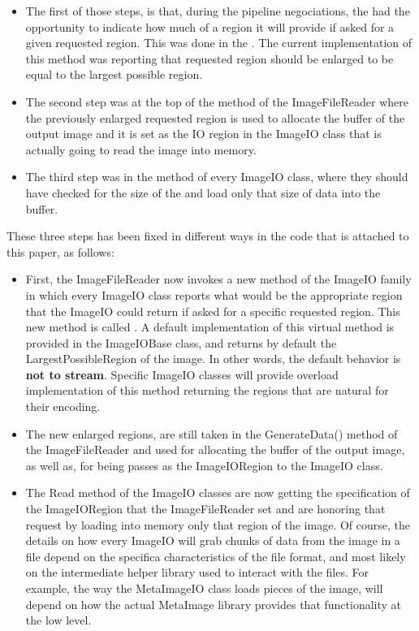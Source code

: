 \documentclass{InsightArticle}
\begin{document}
\begin{itemize}
\item The first of those steps, is that, during the pipeline negociations, the
 had the opportunity to indicate how much of a region
it will provide if asked for a given requested region. This was done in the
. The current implementation of this method
was reporting that requested region should be enlarged to be equal to the largest
possible region.

\item The second step was at the top of the  method of the ImageFileReader
where the previously enlarged requested region is used to allocate the buffer of the output
image and it is set as the IO region in the ImageIO class that is actually going to read
the image into memory.

\item The third step was in the  method of every ImageIO class, where they should have
checked for the size of the  and load only that size of data into the
buffer.
\end{itemize}

These three steps has been fixed in different ways in the code that is attached
to this paper, as follows:


\begin{itemize}
\item First, the ImageFileReader now invokes a new method of the ImageIO family
in which every ImageIO class reports what would be the appropriate region that
the ImageIO could return if asked for a specific requested region. This new
method is called . A
default implementation of this virtual method is provided in the ImageIOBase
class, and returns by default the LargestPossibleRegion of the image. In other
words, the default behavior is \textbf{not to stream}. Specific ImageIO classes
will provide overload implementation of this method returning the regions that
are natural for their encoding.

\item The new enlarged regions, are still taken in the GenerateData() method of
the ImageFileReader and used for allocating the buffer of the output image, as
well as, for being passes as the ImageIORegion to the ImageIO class.

\item The Read method of the ImageIO classes are now getting the specification
of the ImageIORegion that the ImageFileReader set and are honoring that request
by loading into memory only that region of the image. Of course, the details on
how every ImageIO will grab chunks of data from the image in a file depend on
the specifica characteristics of the file format, and most likely on the
intermediate helper library used to interact with the files. For example, the
way the MetaImageIO class loads pieces of the image, will depend on how the
actual MetaImage library provides that functionality at the low level.
\end{itemize}
\end{document}

